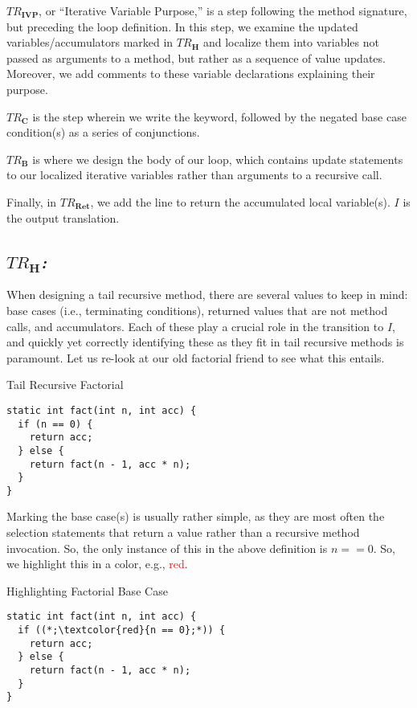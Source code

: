 \textit{$TR_\mathbf{IVP}$}, or ``Iterative Variable Purpose,'' is a step following the method signature, but preceding the loop definition. In this step, we examine the updated variables/accumulators marked in \textit{$TR_\mathbf{H}$} and localize them into variables not passed as arguments to a method, but rather as a sequence of value updates. Moreover, we add comments to these variable declarations explaining their purpose.

\textit{$TR_\mathbf{C}$} is the step wherein we write the  keyword, followed by the negated base case condition(s) as a series of conjunctions.

\textit{$TR_\mathbf{B}$} is where we design the body of our loop, which contains update statements to our localized iterative variables rather than arguments to a recursive call.

Finally, in \textit{$TR_\mathbf{Ret}$}, we add the line to return the accumulated local variable(s). $I$ is the output translation.

\subsection*{\textit{$TR_\mathbf{H}$:}} When designing a tail recursive method, there are several values to keep in mind: base cases (i.e., terminating conditions), returned values that are not method calls, and accumulators. Each of these play a crucial role in the transition to $I$, and quickly yet correctly identifying these as they fit in tail recursive methods is paramount. Let us re-look at our old factorial friend to see what this entails.

\begin{cl}[]{Tail Recursive Factorial}
\begin{lstlisting}[language=MyJava]
static int fact(int n, int acc) {
  if (n == 0) {
    return acc;
  } else {
    return fact(n - 1, acc * n);
  }
}
\end{lstlisting}
\end{cl}

Marking the base case(s) is usually rather simple, as they are most often the selection statements that return a value rather than a recursive method invocation. So, the only instance of this in the above definition is $n == 0$. So, we highlight this in a color, e.g., \textcolor{red}{red}.

\begin{cl}[]{Highlighting Factorial Base Case}
\begin{lstlisting}[language=MyJava]
static int fact(int n, int acc) {
  if ((*;\textcolor{red}{n == 0};*)) {
    return acc;
  } else {
    return fact(n - 1, acc * n);
  }
}
\end{lstlisting}
\end{cl}

